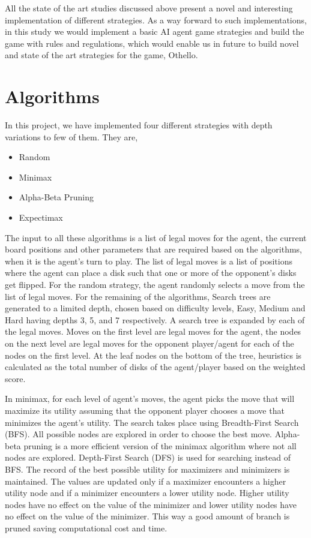 \documentclass{svproc}
\begin{document}
All the state of the art studies discussed above present a novel and interesting implementation of different strategies. As a way forward to such implementations, in this study we would implement a basic AI agent game strategies and build the game with rules and regulations, which would enable us in future to build novel and state of the art strategies for the game, Othello.

\section{Algorithms}\label{3}

In this project, we have implemented four different strategies with depth variations to few of them. They are,

\begin{itemize}
    \item Random
    \item Minimax
    \item Alpha-Beta Pruning
    \item Expectimax
\end{itemize}

The input to all these algorithms is a list of legal moves for the agent, the current board positions and other parameters that are required based on the algorithms, when it is the agent’s turn to play. The list of legal moves is a list of positions where the agent can place a disk such that one or more of the opponent’s disks get flipped. For the random strategy, the agent randomly selects a move from the list of legal moves. For the remaining of the algorithms, Search trees are generated to a limited depth, chosen based on difficulty levels, Easy, Medium and Hard having depths 3, 5, and 7 respectively. A  search tree is expanded by each of the legal moves. Moves on the first level are legal moves for the agent, the nodes on the next level are legal moves for the opponent player/agent for each of the nodes on the first level. At the leaf nodes on the bottom of the tree, heuristics is calculated as the total number of disks of the agent/player based on the weighted score.

In minimax, for each level of agent's moves, the agent picks the move that will maximize its utility assuming that the opponent player chooses a move that minimizes the agent’s utility. The search takes place using Breadth-First Search (BFS). All possible nodes are explored in order to choose the best move.
Alpha-beta pruning is a more efficient version of the minimax algorithm where not all nodes are explored. Depth-First Search (DFS) is used for searching instead of BFS. The record of the best possible utility for maximizers and minimizers is maintained.  The values are updated only if a maximizer encounters a higher utility node and if a minimizer encounters a lower utility node. Higher utility nodes have no effect on the value of the minimizer and lower utility nodes have no effect on the value of the minimizer. This way a good amount of branch is pruned saving computational cost and time.
\end{document}

